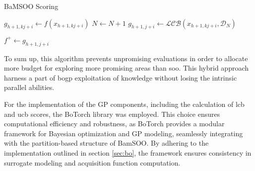 \begin{algorithm}
\caption{BaMSOO Scoring}
\label{algo:bamsoo}
\begin{algorithmic}[1]
                 
                    \State $g_{h+1,kj+i} \gets f(x_{h+1,kj+i}) $ 
                    \State $N \gets N+1$ 
                \Else
                    \State $g_{h+1,j+i} \gets \mathcal{LCB}(x_{h+1,kj+i},\mathcal D_N) $ 
                \EndIf

                    \State $f^+ \gets g_{h+1,j+i} $ 
                \EndIf         
\end{algorithmic}
\end{algorithm}

To sum up, this algorithm prevents unpromising evaluations in order to allocate more budget for exploring more promising areas than \acrshort{soo}. This hybrid approach harness a part of \acrshort{bogp} exploitation of knowledge without losing the intrinsic parallel abilities.

For the implementation of the GP components, including the calculation of \acrshort{lcb} and \acrshort{ucb} scores, the BoTorch library was employed. This choice ensures computational efficiency and robustness, as BoTorch provides a modular framework for Bayesian optimization and GP modeling, seamlessly integrating with the partition-based structure of BamSOO. By adhering to the implementation outlined in section \ref{sec:bo}, the framework ensures consistency in surrogate modeling and acquisition function computation.

